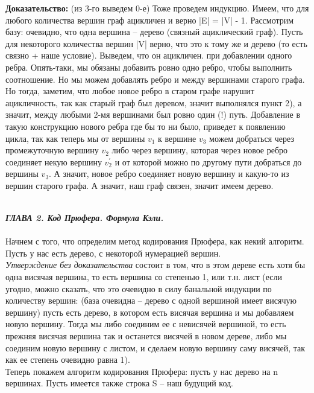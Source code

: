 \documentclass[12pt]{article}
\begin{document}
\textbf{Доказательство:} (из 3-го выведем 0-е) Тоже проведем индукцию. Имеем, что для любого количества вершин граф ацикличен и верно |E| = |V| - 1. Рассмотрим базу: очевидно, что одна вершина -- дерево (связный ациклический граф). Пусть для некоторого количества вершин |V| верно, что это к тому же и дерево (то есть связно + наше условие). Выведем, что он ацикличен. при добавлении одного ребра. Опять-таки, мы обязаны добавить ровно одно ребро, чтобы выполнить соотношение. Но мы можем добавлять ребро и между вершинами старого графа. Но тогда, заметим, что любое новое ребро в старом графе нарушит ацикличность, так как старый граф был деревом, значит выполнялся пункт 2), а значит, между любыми 2-мя вершинами был ровно один (!) путь. Добавление в такую конструкцию нового ребра где бы то ни было, приведет к появлению цикла, так как теперь мы от вершины \({v_{1}}\) к вершине \({v_{3}}\) можем добраться через промежуточную вершину \({v_{2}}\) либо через вершину, которая через новое ребро соединяет некую вершину \({v_{2}^{'}}\) и от которой можно по другому пути добраться до вершины \(\mathit{v_{3}}\). А значит, новое ребро соединяет новую вершину и какую-то из вершин старого графа. А значит, наш граф связен, значит имеем дерево.

\newpage
\\
\textbf{\textit{ГЛАВА 2. Код Прюфера. Формула Кэли.}}
\\
\\

Начнем  с того, что определим метод кодирования Прюфера, как некий алгоритм.
Пусть у нас есть дерево, с некоторой нумерацией вершин. \\

\textit{Утверждение без доказательства} состоит в том, что в этом дереве есть хотя бы одна висячая вершина, то есть вершина со степенью 1, или т.н. лист (если угодно, можно сказать, что это очевидно в силу банальной индукции по количеству вершин: (база очевидна -- дерево с одной вершиной имеет висячую вершину) пусть есть дерево, в котором есть висячая вершина и мы добавляем новую вершину. Тогда мы либо соединим ее с невисячей вершиной, то есть прежняя висячая вершина так и останется висячей в новом дереве, либо мы соединим новую вершину с листом, и сделаем новую вершину саму висячей, так как ее степень очевидно равна 1).\\

Теперь покажем алгоритм кодирования Прюфера: пусть у нас дерево на n вершинах. Пусть имеется также строка S -- наш будущий код.
\\
\end{document}
